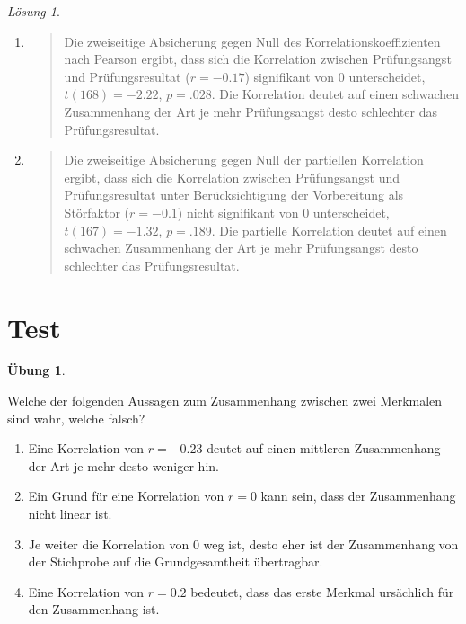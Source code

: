 \documentclass[
]{book}
\providecommand{\tightlist}{%
  \setlength{\itemsep}{0pt}\setlength{\parskip}{0pt}}
\theoremstyle{definition}
\theoremstyle{definition}
\theoremstyle{definition}
\newtheorem{exercise}{Übung}[chapter]
\theoremstyle{definition}
\theoremstyle{remark}
\newtheorem*{solution}{Lösung}
\begin{document}
\begin{solution}
\begin{enumerate}
\def\labelenumi{\alph{enumi})}
\item
  \begin{quote}
  Die zweiseitige Absicherung gegen Null des Korrelationskoeffizienten nach Pearson ergibt, dass sich die Korrelation zwischen Prüfungsangst und Prüfungsresultat (\(r = -0.17\)) signifikant von \(0\) unterscheidet, \(t(168) = -2.22\), \(p = .028\). Die Korrelation deutet auf einen schwachen Zusammenhang der Art je mehr Prüfungsangst desto schlechter das Prüfungsresultat.
  \end{quote}
\item
  \begin{quote}
  Die zweiseitige Absicherung gegen Null der partiellen Korrelation ergibt, dass sich die Korrelation zwischen Prüfungsangst und Prüfungsresultat unter Berücksichtigung der Vorbereitung als Störfaktor (\(r = -0.1\)) nicht signifikant von \(0\) unterscheidet, \(t(167) = -1.32\), \(p = .189\). Die partielle Korrelation deutet auf einen schwachen Zusammenhang der Art je mehr Prüfungsangst desto schlechter das Prüfungsresultat.
  \end{quote}
\end{enumerate}

\end{solution}

\section{Test}\label{test-4}

\begin{exercise}
\protect\hypertarget{exr:test-theorie-korrelation}{}\label{exr:test-theorie-korrelation}

Welche der folgenden Aussagen zum Zusammenhang zwischen zwei Merkmalen sind wahr, welche falsch?

\begin{enumerate}
\def\labelenumi{\alph{enumi})}
\tightlist
\item
  Eine Korrelation von \(r = -0.23\) deutet auf einen mittleren Zusammenhang der Art je mehr desto weniger hin.
\item
  Ein Grund für eine Korrelation von \(r=0\) kann sein, dass der Zusammenhang nicht linear ist.
\item
  Je weiter die Korrelation von \(0\) weg ist, desto eher ist der Zusammenhang von der Stichprobe auf die Grundgesamtheit übertragbar.
\item
  Eine Korrelation von \(r = 0.2\) bedeutet, dass das erste Merkmal ursächlich für den Zusammenhang ist.
\end{enumerate}

\end{exercise}
\end{document}
